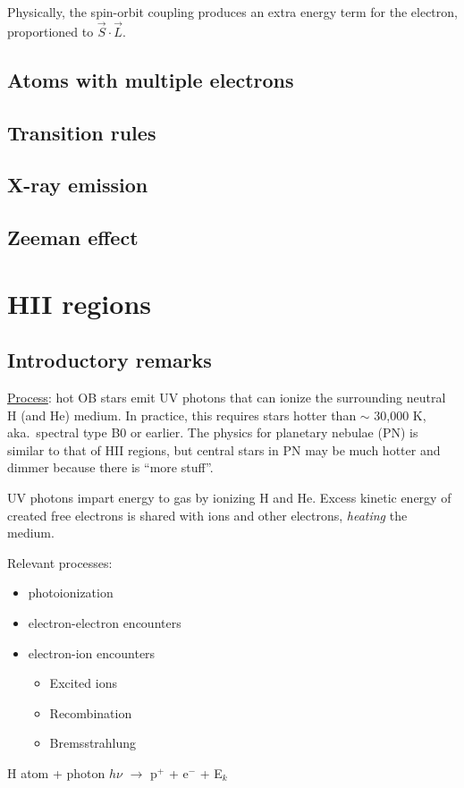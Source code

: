 \documentclass[12pt]{article}
\newcommand{\mar}[1]{\hspace{0pt}\marginpar{-\textcolor{black}{#1}-}}
\let\oldsection\section
\renewcommand\section{\clearpage\oldsection}
\begin{document}
Physically, the spin-orbit coupling produces an extra energy term for the
electron, proportioned to $\vec{S}\cdot\vec{L}$.

\mar{I10}
\subsection{Atoms with multiple electrons}

\mar{I11}
\mar{I12}
\mar{I13}
\mar{I14}
\mar{I15}
\mar{I16}
\mar{I17}
\mar{I18}
\mar{I19}
\subsection{Transition rules}

\mar{I20}
\subsection{X-ray emission}
\subsection{Zeeman effect}

\mar{I21}

\newpage
\mar{51}
\section{HII regions}
\subsection{Introductory remarks}
\underline{Process}: hot OB stars emit UV photons that can ionize the
surrounding neutral H (and He) medium. In practice, this requires stars hotter
than $\sim$ 30,000 K, aka.\ spectral type B0 or earlier.
The physics for planetary nebulae (PN) is similar to that of HII regions,
but central stars in PN may be much hotter and dimmer
because there is ``more stuff''.

UV photons impart energy to gas by ionizing H and He. Excess kinetic energy
of created free electrons is shared with ions and other electrons,
\emph{heating} the medium.

Relevant processes:
\begin{itemize}
    \item photoionization
    \item electron-electron encounters
    \item electron-ion encounters
        \begin{itemize}
            \item Excited ions
            \item Recombination
            \item Bremsstrahlung
        \end{itemize}
\end{itemize}
H atom + photon $h\nu$ $\longrightarrow$ p$^{+}$ + e$^{-}$ + E$_{k}$
\end{document}
